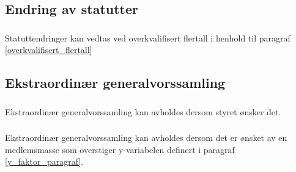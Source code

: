 \documentclass{article}
\newenvironment{statute}[1][]
    {
        \titleformat{\subsubsection}[runin]{\normalfont}{\hspace{1pt}\textit{\S\hspace{5pt}\thesubsubsection}}{0pt}{\rule{4pt}{0pt}}{}
        \subsubsection{}#1
        \begin{minipage}[t]{0.9\linewidth}
    }
    {
        \end{minipage}
        
        \ignorespacesafterend
    }
\begin{document}
        \subsection{Endring av statutter}
            \begin{statute}
                Statuttendringer kan vedtas ved overkvalifisert flertall i henhold til paragraf  \ref{overkvalifisert_flertall}
            \end{statute}
            
        \subsection{Ekstraordinær generalvorssamling}
            \begin{statute}
                Ekstraordinær generalvorssamling kan avholdes dersom styret ønsker det.
            \end{statute}
            \begin{statute}
                Ekstraordinær generalvorssamling kan avholdes dersom det er ønsket av en medlemsmasse som overstiger y-variabelen definert i paragraf \ref{y_faktor_paragraf}.
            \end{statute}
\end{document}
